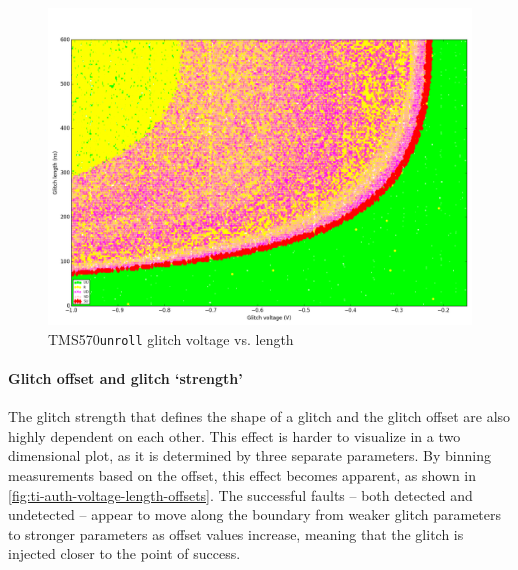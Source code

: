 \documentclass[10pt]{article}
\newcommand{\TI}{TMS570\xspace}
\newcommand{\unroll}{\texttt{unroll}\xspace}
\begin{document}
        \begin{figure}[H]
          \centering
          \includegraphics[width=\textwidth]{../plots/newplots/ti-unroll-voltage-length.png}
          \caption{\TI \unroll glitch voltage vs. length}
          \label{fig:ti-unroll-voltage-length}
        \end{figure}

        \paragraph*{Glitch offset and glitch `strength'} %
          The glitch strength that defines the shape of a glitch and the glitch offset are also highly dependent on each other. This effect is harder to visualize in a two dimensional plot, as it is determined by three separate parameters. By binning measurements based on the offset, this effect becomes apparent, as shown in \autoref{fig:ti-auth-voltage-length-offsets}. The successful faults -- both detected and undetected -- appear to move along the boundary from weaker glitch parameters to stronger parameters as offset values increase, meaning that the glitch is injected closer to the point of success.
\end{document}
